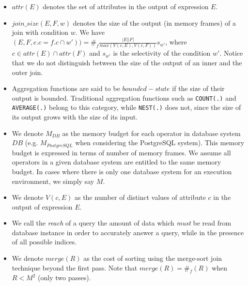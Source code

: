 \begin{itemize}
\item $attr(E)$ denotes the set of attributes in the output of expression $E$.
\item $join\_size(E,F,w)$ denotes the size of the output (in memory frames) of a join with condition $w$. We have $(E,F,e.c = f.c \cap w')) = \#_f \frac{|E| |F|}{max(V(c,E),V(c,F))} s_{w'}$, where $c \in attr(E) \cap attr(F)$ and $s_{w'}$ is the selectivity of the condition $w'$. Notice that we do not distinguish between the size of the output of an inner and the outer join.
\item Aggregation functions are said to be $bounded-state$ if the size of their output is bounded. Traditional aggregation functions such as \texttt{COUNT(.)} and \texttt{AVERAGE(.)} belong to this category, while \texttt{NEST(.)} does not, since the size of its output grows with the size of its input.
\item We denote $M_{DB}$ as the memory budget for each operator in database system $DB$ (e.g. $M_{PostgreSQL}$ when considering the PostgreSQL system). This memory budget is expressed in terms of number of memory frames. We assume all operators in a given database system are entitled to the same memory budget. In cases where there is only one database system for an execution environment, we simply say $M$.
\item We denote $V(c,E)$ as the number of distinct values of attribute $c$ in the output of expression $E$.
\item We call the \emph{reach} of a query the amount of data which \emph{must} be read from database instance in order to accurately answer a query, while in the presence of all possible indices.
\item We denote $merge(R)$ as the cost of sorting using the merge-sort join technique beyond the first pass.  Note that $merge(R) = \#_f(R)$ when $R < M^2$ (only two passes).
\end{itemize}

